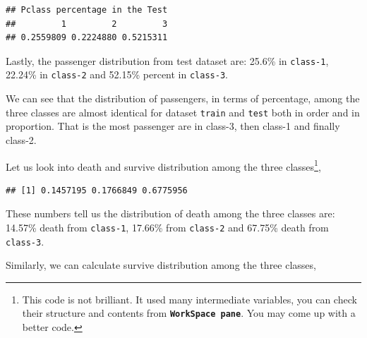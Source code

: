 \documentclass[
]{book}
\newenvironment{Shaded}{\begin{snugshade}}{\end{snugshade}}
\newcommand{\CommentTok}[1]{\textcolor[rgb]{0.56,0.35,0.01}{\textit{#1}}}
\newcommand{\DecValTok}[1]{\textcolor[rgb]{0.00,0.00,0.81}{#1}}
\newcommand{\KeywordTok}[1]{\textcolor[rgb]{0.13,0.29,0.53}{\textbf{#1}}}
\newcommand{\NormalTok}[1]{#1}
\newcommand{\OperatorTok}[1]{\textcolor[rgb]{0.81,0.36,0.00}{\textbf{#1}}}
\newcommand{\StringTok}[1]{\textcolor[rgb]{0.31,0.60,0.02}{#1}}
\begin{document}
\begin{verbatim}
## Pclass percentage in the Test
##         1         2         3 
## 0.2559809 0.2224880 0.5215311
\end{verbatim}

Lastly, the passenger distribution from test dataset are: 25.6\% in \texttt{class-1}, 22.24\% in \texttt{class-2} and 52.15\% percent in \texttt{class-3}.

We can see that the distribution of passengers, in terms of percentage, among the three classes are almost identical for dataset \texttt{train} and \texttt{test} both in order and in proportion. That is the most passenger are in class-3, then class-1 and finally class-2.

Let us look into death and survive distribution among the three classes\footnote{This code is not brilliant. It used many intermediate variables, you can check their structure and contents from \textbf{\texttt{WorkSpace\ pane}}. You may come up with a better code.},

\begin{Shaded}
\end{Shaded}

\begin{verbatim}
## [1] 0.1457195 0.1766849 0.6775956
\end{verbatim}

These numbers tell us the distribution of death among the three classes are: 14.57\% death from \texttt{class-1}, 17.66\% from \texttt{class-2} and 67.75\% death from \texttt{class-3}.

Similarly, we can calculate survive distribution among the three classes,

\begin{Shaded}
\end{Shaded}
\end{document}

